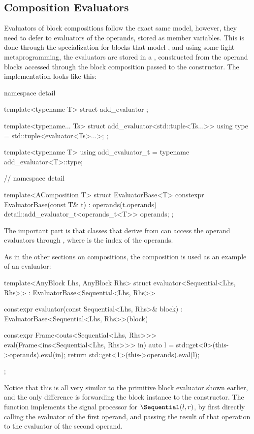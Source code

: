 \subsection{Composition Evaluators}

Evaluators of block compositions follow the exact same model, however, they need to defer to evaluators of
the operands, stored as member variables. This is done through the  specialization for
blocks that model , and using some light metaprogramming, the evaluators are stored in
a , constructed from the operand blocks accessed through the block composition passed
to the constructor. The implementation looks like this:

\begin{cppcodenl}
  namespace detail {
    template<typename T>
    struct add_evaluator {};

    template<typename... Ts>
    struct add_evaluator<std::tuple<Ts...>> {
      using type = std::tuple<evaluator<Ts>...>;
    };

    template<typename T>
    using add_evaluator_t = typename add_evaluator<T>::type;
  } // namespace detail

  template<AComposition T>
  struct EvaluatorBase<T> {
    constexpr EvaluatorBase(const T& t) : operands(t.operands) {}
    detail::add_evaluator_t<operands_t<T>> operands;
  };
\end{cppcodenl}

The important part is that classes that derive from  can access the operand evaluators
through , where  is the index of the operands.

As in the other sections on compositions, the \Sequential composition is used as an example of an evaluator:

\begin{cppcodenl}
  template<AnyBlock Lhs, AnyBlock Rhs>
  struct evaluator<Sequential<Lhs, Rhs>> : EvaluatorBase<Sequential<Lhs, Rhs>> {
    constexpr evaluator(const Sequential<Lhs, Rhs>& block) : EvaluatorBase<Sequential<Lhs, Rhs>>(block) {}

    constexpr Frame<outs<Sequential<Lhs, Rhs>>> eval(Frame<ins<Sequential<Lhs, Rhs>>> in)
    {
      auto l = std::get<0>(this->operands).eval(in);
      return std::get<1>(this->operands).eval(l);
    }
  };
\end{cppcodenl}

Notice that this is all very similar to the primitive block evaluator shown earlier, and the only difference
is forwarding the block instance to the  constructor.  The  function implements the signal processor
for $\Sequential(l, r)$, by first directly calling the evaluator of the first operand, and passing the
result of that operation to the evaluator of the second operand.

